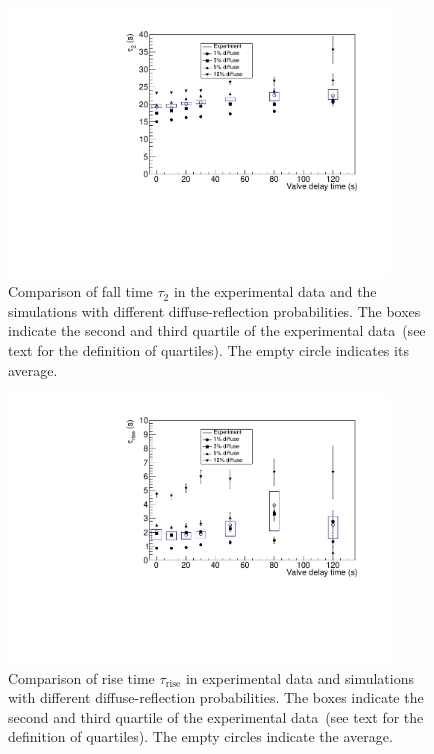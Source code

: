 	
\begin{figure}[h!]
  \centering \includegraphics[width=0.9\textwidth]{falltime.pdf}
  \caption[Comparison of UCN fall time between simulations and data
  ]{Comparison of fall time $\tau_2$ in the experimental data and the
    simulations with different diffuse-reflection probabilities. The
    boxes indicate the second and third quartile of the experimental
    data~(see text for the definition of quartiles).  The empty circle
    indicates its average.}
\label{fig:falltime}
\end{figure}

\begin{figure}[h!]
\centering
\includegraphics[width=0.9\textwidth]{risetime.pdf}
\caption[Comparison of UCN rise time between simulations and
data]{Comparison of rise time $\tau_{\mathrm{rise}}$ in experimental
  data and simulations with different diffuse-reflection
  probabilities. The boxes indicate the second and third quartile of
  the experimental data~(see text for the definition of
  quartiles). The empty circles indicate the average.}
\label{fig:risetime}
\end{figure}



